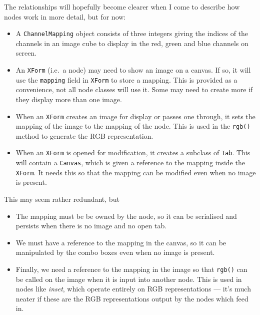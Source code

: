 The relationships will hopefully become clearer when I come to describe how nodes work in more
detail, but for now:
\begin{itemize}
\item A \texttt{ChannelMapping} object consists of three integers giving the indices of 
the channels in an image cube to display in the red, green and blue channels on screen.
\item An \texttt{XForm} (i.e.\ a node) may need to show an image on a canvas. If so, it 
will use the \texttt{mapping} field in \texttt{XForm} to store a mapping. This is provided
as a convenience, not all node classes will use it. Some may need to create more if they 
display more than one image.
\item When an \texttt{XForm} creates an image for display or passes
one through, it sets the mapping of the image to the mapping of the node. This is used in the
\texttt{rgb()} method to generate the RGB representation.
\item When an \texttt{XForm} is opened for modification, it creates a subclass of \texttt{Tab}.
This will contain a \texttt{Canvas}, which is given a reference to the mapping inside the
\texttt{XForm}. It needs this so that the mapping can be modified even when no image is present.
\end{itemize}
This may seem rather redundant, but
\begin{itemize}
\item The mapping must be be owned by the node, so it can be serialised and persists when
there is no image and no open tab.
\item We must have a reference to the mapping in the canvas, so it can be manipulated by
the combo boxes even when no image is present.
\item Finally, we need a reference to the mapping in the image so that \texttt{rgb()} can be called
on the image when it is input into another node. This is used in nodes like \emph{inset}, which
operate entirely on RGB representations --- it's much neater if these are the RGB representations
output by the nodes which feed in.
\end{itemize}


